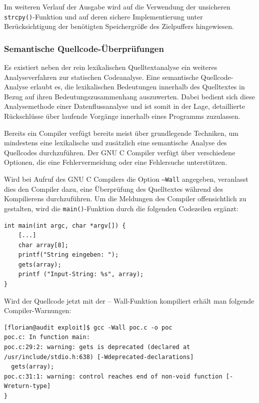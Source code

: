 Im weiteren Verlauf der Ausgabe wird auf die Verwendung der 
unsicheren \texttt{strcpy()}-Funktion und auf deren sichere 
Implementierung unter Berücksichtigung der benötigten Speichergröße 
des Zielpuffers hingewiesen.

\subsubsection{Semantische Quellcode-Überprüfungen}

Es existiert neben der rein lexikalischen Quelltextanalyse ein weiteres 
Analyseverfahren zur statischen Codeanalyse. Eine semantische 
Quellcode-Analyse erlaubt es, die lexikalischen Bedeutungen innerhalb des 
Quelltextes in Bezug auf ihren Bedeutungszusammenhang auszuwerten. 
Dabei bedient sich diese Analysemethode einer Datenflussanalyse und ist 
somit in der Lage, detaillierte Rückschlüsse über laufende Vorgänge 
innerhalb eines Programms zuzulassen.


Bereits ein Compiler verfügt bereits meist über grundlegende Techniken, 
um mindestens eine lexikalische und zusätzlich eine semantische Analyse 
des Quellcodes durchzuführen. Der GNU C Compiler verfügt über verschiedene 
Optionen, die eine Fehlervermeidung oder eine Fehlersuche unterstützen.

Wird bei Aufruf des GNU C Compilers die Option \texttt{–Wall} angegeben, 
veranlasst dies den Compiler dazu, eine Überprüfung des Quelltextes 
während des Kompilierens durchzuführen. Um die Meldungen des Compiler 
offensichtlich zu gestalten, wird die \texttt{main()}-Funktion durch 
die folgenden Codezeilen ergänzt:

\begin{lstlisting}[basicstyle=\ttfamily\footnotesize]
int main(int argc, char *argv[]) {
    [...]
    char array[8];
    printf("String eingeben: ");
    gets(array);
    printf ("Input-String: %s", array);
}
\end{lstlisting}

Wird der Quellcode jetzt mit der – Wall-Funktion kompiliert erhält man 
folgende Compiler-Warnungen:

\begin{lstlisting}[basicstyle=\ttfamily\footnotesize]
[florian@audit exploit]$ gcc -Wall poc.c -o poc
poc.c: In function main:
poc.c:29:2: warning: gets is deprecated (declared at /usr/include/stdio.h:638) [-Wdeprecated-declarations]
  gets(array);
poc.c:31:1: warning: control reaches end of non-void function [-Wreturn-type]
}
\end{lstlisting}

